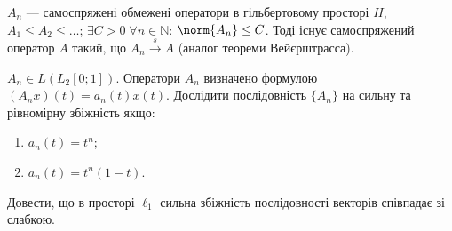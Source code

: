 \begin{exercise}
    $A_n$ --- самоспряжені обмежені оператори в гільбертовому просторі $H$,
    $A_1 \leq A_2 \leq \dots$; $\exists C > 0 \; \forall n \in \mathbb{N}$: $\norm{A_n}\leq C$.
    Тоді існує самоспряжений оператор $A$ такий, що $A_n \overset{s}{\to} A$
    (аналог теореми Вейєрштрасса).
\end{exercise}

\begin{exercise}
    $A_n \in L(L_2[0;1])$. Оператори $A_n$ визначено формулою $(A_n x)(t) = a_n(t) x(t)$.
    Дослідити послідовність $\{A_n\}$ на сильну та рівномірну збіжність якщо:
    \begin{enumerate}
        \item $a_n(t) = t^n$;
        \item $a_n(t) = t^n (1-t)$.
    \end{enumerate}
\end{exercise}

\begin{exercise*}
    Довести, що в просторі $\ell_1$ сильна збіжність послідовності векторів співпадає зі слабкою.
\end{exercise*}